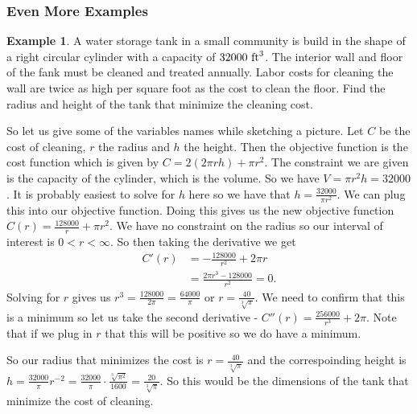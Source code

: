 \documentclass[12pt,reqno]{article}
\theoremstyle{definition}
\newtheorem*{Example}{Example}
\begin{document}
\subsubsection{Even More Examples}
	\begin{Example}
		A water storage tank in a small community is build in the shape of a right circular cylinder with a capacity of $32000 \textnormal{ ft}^3$. The interior wall and floor of the fank must be cleaned and treated annually. Labor costs for cleaning the wall are twice as high per square foot as the cost to clean the floor. Find the radius and height of the tank that minimize the cleaning cost. 
		
		So let us give some of the variables names while sketching a picture. Let $C$ be the cost of cleaning, $r$ the radius and $h$ the height. Then the objective function is the cost function which is given by $C = 2(2\pi rh) + \pi r^2$. 
		The constraint we are given is the capacity of the cylinder, which is the volume. So we have $V = \pi r^2 h = 32000$. It is probably easiest to solve for $h$ here so we have that $h = \frac{32000}{\pi r^2}$. We can plug this into our objective function. 
		Doing this gives us the new objective function $C(r) = \frac{128000}{r} + \pi r^2$. We have no constraint on the radius so our interval of interest is $0 < r < \infty$. So then taking the derivative we get 
		\begin{align*}
			C'(r) &= -\frac{128000}{r^2} + 2\pi r \\
				  &= \frac{2\pi r^3 - 128000}{r^2} = 0.
		\end{align*}
		Solving for $r$ gives us $r^3 = \frac{128000}{2 \pi} = \frac{64000}{\pi}$ or $r = \frac{40}{\sqrt[3]{\pi}}$. 
		We need to confirm that this is a minimum so let us take the second derivative - $C''(r) = \frac{256000}{r^3} + 2\pi$. Note that if we plug in $r$ that this will be positive so we do have a minimum. 
		
		So our radius that minimizes the cost is $r = \frac{40}{\sqrt[3]{\pi}}$ and the correspoinding height is $h = \frac{32000}{\pi} r^{-2} = \frac{32000}{\pi} \cdot \frac{\sqrt[3]{\pi^2}}{1600} = \frac{20}{\sqrt[3]{\pi}}$. So this would be the dimensions of the tank that minimize the cost of cleaning.
	\end{Example}
	
\end{document}
